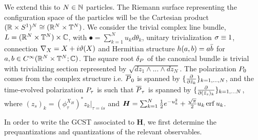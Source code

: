 \documentclass[notas.tex]{subfiles}
\begin{document}
We extend this to $N \in \mathbb{N}$ particles. The Riemann surface representing the configuration space of the particles will be the Cartesian product $(\mathbb{R} \times S^1)^N \cong (\mathbb{R}^{N} \times \mathbb{T}^N)$. We consider the trivial complex line bundle, $L = (\mathbb{R}^{N} \times \mathbb{T}^N) \times \mathbb{C}$, with $\spot = \sum_{k=1}^{N} u_k d\theta_k$, unitary trivialization $\sigma \equiv 1$, connection $\nabla_{X} = X + i \vartheta(X)$ and Hermitian structure $h(a,b) = a \bar{b}$ for $a, b \in C^\infty(\mathbb{R}^{N} \times \mathbb{T}^N; \mathbb{C})$. The square root $\delta_P$ of the canonical bundle is trivial with trivializing section represented by $\sqrt{dz_1 \wedge ... \wedge dz_N}$. The polarization $P_0$ comes from the complex structure i.e. $\overline {P}_0$ is spanned by $\{\frac{\partial }{\partial \bar z_k}\}_{k=1,...,N}$, and the time-evolved polarization $P_\tau$ is such that $\overline {P}_\tau$ is spanned by $\{\frac{\partial }{\partial  (\bar z_{s})_k}\}_{k=1,...N}$, where $(z_{s})_k = \left ( \phi_{\tau}^{X_H} \right )^* z_k \big|_{\tau=is}$ and $\bm{H} = \sum_{k=1}^{N} \frac{1}{2}e^{- u_k^2} + \frac{\sqrt{\pi}}{2}u_k\operatorname{erf}{u_k}$. 

In order to write the GCST associated to $\bm{H}$, we first determine the prequantizations and quantizations of the relevant observables. 
\end{document}
